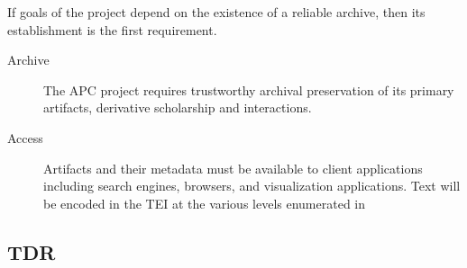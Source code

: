 If goals of the project depend on the existence of a reliable archive, then its establishment is the first requirement.
\begin{description}
  \item[Archive]The APC project requires trustworthy archival preservation of its primary artifacts, derivative scholarship and interactions.
  \item[Access] Artifacts and their metadata must be available to client applications including search engines, browsers, and visualization applications. Text will be encoded in the TEI at the various levels enumerated in \cite{tei_sig_on_libraries_best_2011} 
\end{description}

\subsection{TDR}

